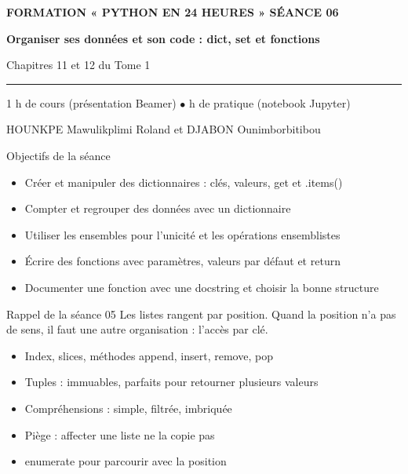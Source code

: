 \documentclass[aspectratio=169,11pt]{beamer}
\begin{document}
{%
\begin{frame}[plain]
\vspace{10mm}
{\color{PyJaune}\small\bfseries FORMATION « PYTHON EN 24 HEURES » \quad\textbar\quad SÉANCE 06\par}
\vspace{4mm}
{\color{white}\Huge\bfseries Organiser ses données et son code : dict, set et fonctions\par}
\vspace{4mm}
{\color{PyBleuClair}\large Chapitres 11 et 12 du Tome 1\par}
\vspace{7mm}
{\color{PyJaune}\rule{34mm}{2.2pt}\par}
\vspace{7mm}
{\color{white}\normalsize 1 h de cours (présentation Beamer) \quad$\bullet$ h de pratique (notebook Jupyter)\par}
\vspace{2.5mm}
{\color{PyBleuClair}\normalsize HOUNKPE Mawulikplimi Roland et DJABON Ounimborbitibou\par}
\end{frame}
}
\begin{frame}{Objectifs de la séance}
\begin{itemize}
  \item Créer et manipuler des dictionnaires : clés, valeurs, get et .items()
  \item Compter et regrouper des données avec un dictionnaire
  \item Utiliser les ensembles pour l'unicité et les opérations ensemblistes
  \item Écrire des fonctions avec paramètres, valeurs par défaut et return
  \item Documenter une fonction avec une docstring et choisir la bonne structure
\end{itemize}
\end{frame}
\begin{frame}{Rappel de la séance 05}
Les listes rangent par position. Quand la position n'a pas de sens, il faut une autre organisation : l'accès par clé.

\begin{itemize}
  \item Index, slices, méthodes append, insert, remove, pop
  \item Tuples : immuables, parfaits pour retourner plusieurs valeurs
  \item Compréhensions : simple, filtrée, imbriquée
  \item Piège : affecter une liste ne la copie pas
  \item enumerate pour parcourir avec la position
\end{itemize}
\end{frame}
\end{document}
